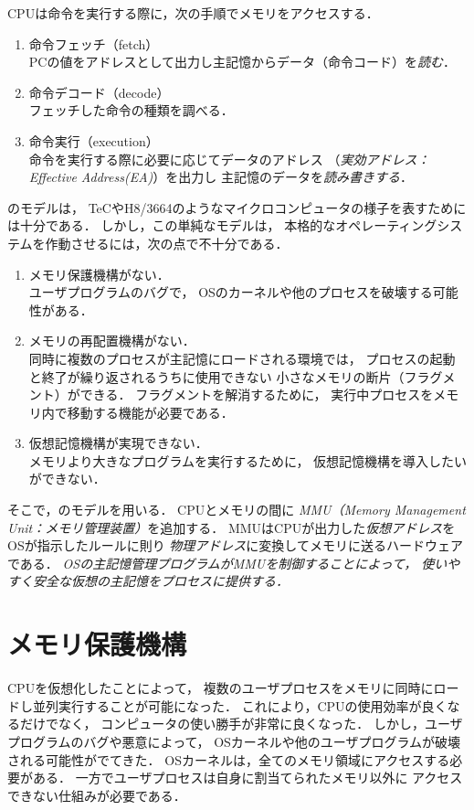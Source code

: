 CPUは命令を実行する際に，次の手順でメモリをアクセスする．
\begin{enumerate}
\item 命令フェッチ（fetch）\\
  PCの値をアドレスとして出力し主記憶からデータ（命令コード）を\emph{読む}．
\item 命令デコード（decode） \\
  フェッチした命令の種類を調べる．
\item 命令実行（execution）\\
  命令を実行する際に必要に応じてデータのアドレス
  （\emph{実効アドレス：Effective Address(EA)}）を出力し
  主記憶のデータを\emph{読み書きする}．
\end{enumerate}

のモデルは，
TeCやH8/3664のようなマイクロコンピュータの様子を表すためには十分である．
しかし，この単純なモデルは，
本格的なオペレーティングシステムを作動させるには，次の点で不十分である．
\begin{enumerate}
\item メモリ保護機構がない．\\
  ユーザプログラムのバグで，
  OSのカーネルや他のプロセスを破壊する可能性がある．
\item メモリの再配置機構がない．\\
  同時に複数のプロセスが主記憶にロードされる環境では，
  プロセスの起動と終了が繰り返されるうちに使用できない
  小さなメモリの断片（フラグメント）ができる．
  フラグメントを解消するために，
  実行中プロセスをメモリ内で移動する機能が必要である．
\item 仮想記憶機構が実現できない．\\
  メモリより大きなプログラムを実行するために，
  仮想記憶機構を導入したいができない．
\end{enumerate}

そこで，のモデルを用いる．
CPUとメモリの間に
\emph{MMU（Memory Management Unit：メモリ管理装置）}を追加する．
MMUはCPUが出力した\emph{仮想アドレス}をOSが指示したルールに則り
\emph{物理アドレス}に変換してメモリに送るハードウェアである．
\emph{OSの主記憶管理プログラムがMMUを制御することによって，
  使いやすく安全な仮想の主記憶をプロセスに提供する．}

\section{メモリ保護機構}
CPUを仮想化したことによって，
複数のユーザプロセスをメモリに同時にロードし並列実行することが可能になった．
これにより，CPUの使用効率が良くなるだけでなく，
コンピュータの使い勝手が非常に良くなった．
しかし，ユーザプログラムのバグや悪意によって，
OSカーネルや他のユーザプログラムが破壊される可能性がでてきた．
OSカーネルは，全てのメモリ領域にアクセスする必要がある．
一方でユーザプロセスは自身に割当てられたメモリ以外に
アクセスできない仕組みが必要である．

